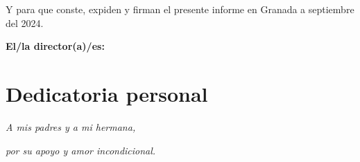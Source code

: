 Y para que conste, expiden y firman el presente informe en Granada a septiembre del 2024.

\vspace{1cm}

\textbf{El/la director(a)/es: }

\vspace{5cm}

\noindent \textbf{\tutor}

\chapter*{Dedicatoria personal}

\begin{center}
	\textit{A mis padres y a mi hermana,}

	\textit{por su apoyo y amor incondicional.}
\end{center}


